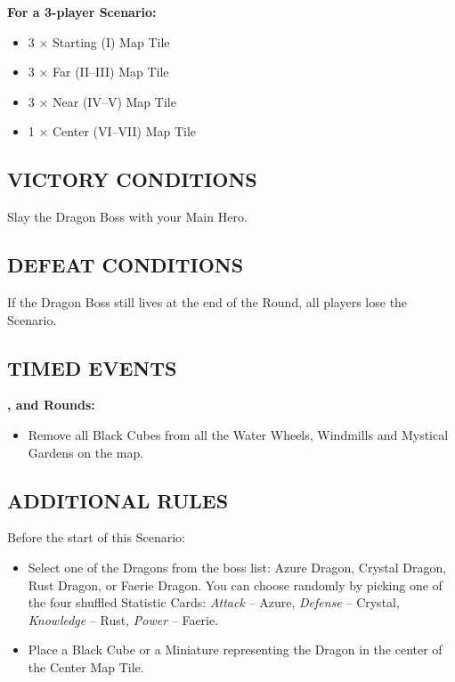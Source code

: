 \begin{multicols*}{2}
\textbf{For a 3-player Scenario:}
\begin{itemize}
  \item 3 × Starting (I) Map Tile
  \item 3 × Far (II--III) Map Tile
  \item 3 × Near (IV--V) Map Tile
  \item 1 × Center (VI--VII) Map Tile
\end{itemize}

\subsection*{\MakeUppercase{Victory Conditions}}
Slay the Dragon Boss with your Main Hero.

\subsection*{\MakeUppercase{Defeat Conditions}}
If the Dragon Boss still lives at the end of the  Round, all players lose the Scenario.

\subsection*{\MakeUppercase{Timed Events}}

\textbf{,  and  Rounds:}
\begin{itemize}
  \item Remove all Black Cubes from all the Water Wheels, Windmills and Mystical Gardens on the map.
\end{itemize}

\subsection*{\MakeUppercase{Additional Rules}}

Before the start of this Scenario:

\begin{itemize}
  \item Select one of the Dragons from the boss list: Azure Dragon, Crystal Dragon, Rust Dragon, or Faerie Dragon.
    You can choose randomly by picking one of the four shuffled Statistic Cards: \textit{Attack} -- Azure, \textit{Defense} -- Crystal, \textit{Knowledge} -- Rust, \textit{Power} -- Faerie.
  \item Place a Black Cube or a Miniature representing the Dragon in the center of the Center Map Tile.
\end{itemize}


\end{multicols*}
